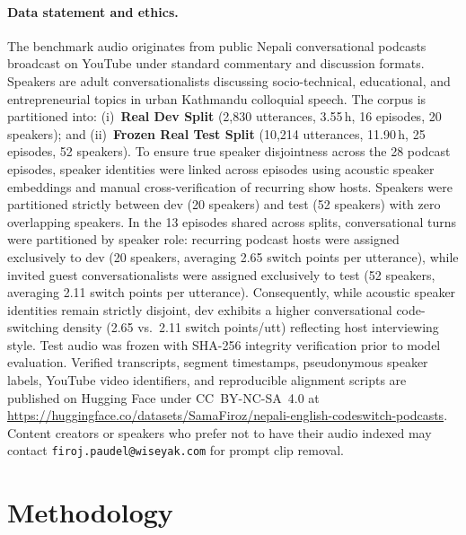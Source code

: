 \documentclass[10pt,twocolumn,a4paper]{article}
\begin{document}
\paragraph{Data statement and ethics.}
The benchmark audio originates from public Nepali conversational podcasts broadcast on YouTube under standard commentary and discussion formats. Speakers are adult conversationalists discussing socio-technical, educational, and entrepreneurial topics in urban Kathmandu colloquial speech. The corpus is partitioned into: (i)~\textbf{Real Dev Split} (2,830 utterances, 3.55\,h, 16 episodes, 20 speakers); and (ii)~\textbf{Frozen Real Test Split} (10,214 utterances, 11.90\,h, 25 episodes, 52 speakers). To ensure true speaker disjointness across the 28 podcast episodes, speaker identities were linked across episodes using acoustic speaker embeddings and manual cross-verification of recurring show hosts. Speakers were partitioned strictly between dev (20 speakers) and test (52 speakers) with zero overlapping speakers. In the 13 episodes shared across splits, conversational turns were partitioned by speaker role: recurring podcast hosts were assigned exclusively to dev (20 speakers, averaging 2.65 switch points per utterance), while invited guest conversationalists were assigned exclusively to test (52 speakers, averaging 2.11 switch points per utterance). Consequently, while acoustic speaker identities remain strictly disjoint, dev exhibits a higher conversational code-switching density (2.65 vs.\ 2.11 switch points/utt) reflecting host interviewing style. Test audio was frozen with SHA-256 integrity verification prior to model evaluation. Verified transcripts, segment timestamps, pseudonymous speaker labels, YouTube video identifiers, and reproducible alignment scripts are published on Hugging Face under CC~BY-NC-SA~4.0 at \url{https://huggingface.co/datasets/SamaFiroz/nepali-english-codeswitch-podcasts}. Content creators or speakers who prefer not to have their audio indexed may contact \texttt{firoj.paudel@wiseyak.com} for prompt clip removal.

\section{Methodology}
\end{document}
